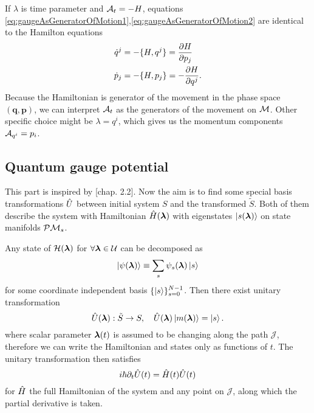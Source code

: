 If $\lambda$ is time parameter and $\mathcal{A}_t=-H$, equations \ref{eq:gaugeAsGeneratorOfMotion1},\ref{eq:gaugeAsGeneratorOfMotion2} are identical to the Hamilton equations
\begin{equation}
\begin{split}
    \dot{q}^j&=-\{H,q^j\} = \frac{\partial H}{\partial p_j}\\
    \dot{p}_j&=-\{H,p_j\} = -\frac{\partial H}{\partial q^j}.
\end{split}
\end{equation}
Because the Hamiltonian is generator of the movement in the phase space $(\bm{q},\bm{p})$, we can interpret $\mathcal{A}_t$ as the generators of the movement on $\mathcal{M}$. Other specific choice might be $\lambda=q^i$, which gives us the momentum components $\mathcal{A}_{q^i}=p_i$.



\subsection{Quantum gauge potential}
This part is inspired by \citet{kolodrubez}[chap. 2.2].
Now the aim is to find some special basis transformations $\hat{U}$ between initial system $S$ and the transformed $\tilde{S}$. Both of them describe the system with Hamiltonian $\hat{H}({\bm\lambda})$ with eigenstates $\ket{s({\bm\lambda})}$ on state manifolds $\mathcal{P}\mathcal{M}_s$. 

Any state of $\mathcal{H}({\bm\lambda})$ for $\forall {\bm\lambda}\in \mathcal U$ can be decomposed as
    \begin{equation}
    \ket{\psi({\bm\lambda})}\equiv \sum_s \psi_s({\bm\lambda})\ket{s}
\end{equation}    
for some coordinate independent basis $\{\ket{s}\}_{s=0}^{N-1}$.
Then there exist unitary transformation
\begin{equation}
    \hat{U}({\bm\lambda}): \tilde S\rightarrow S,\quad \hat{U}({\bm\lambda})\ket{m({\bm\lambda})}=\ket{s}.
    \label{eq:transformationU}
\end{equation}
where scalar parameter ${\bm\lambda}(t)$ is assumed to be changing along the path $\mathcal J$, therefore we can write the Hamiltonian and states only as functions of $t$. The unitary transformation then satisfies
\begin{equation}
    i\hbar \partial_t \hat{U}(t)=\hat{H}(t)\hat{U}(t)
    \label{eq:schrodingerForU}
\end{equation}
for $\hat{H}$ the full Hamiltonian of the system and any point on $\mathcal J$, along which the partial derivative is taken.


